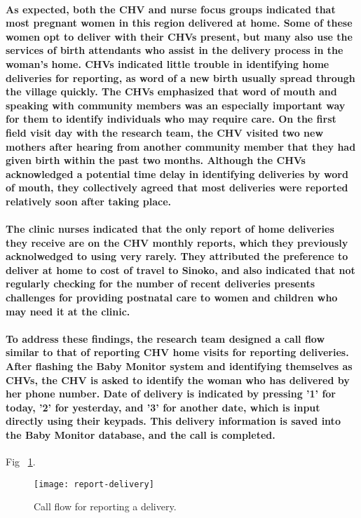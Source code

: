 \paragraph{As expected, both the CHV and nurse focus  groups indicated that most pregnant women in this region delivered at home. Some of these women opt to deliver with their CHVs present, but many also use the services of birth attendants who assist in the delivery process in the woman's home. CHVs indicated little trouble in identifying home deliveries for reporting, as word of a new birth usually spread through the village quickly. The CHVs emphasized that word of mouth and  speaking with community members was an especially important way for them to identify individuals who may require care. On the first field visit day with the research team, the CHV visited  two new mothers after hearing from another community member that they had given birth within the past two months. Although the CHVs acknowledged a potential time delay in identifying deliveries by word of mouth, they collectively agreed that most deliveries were reported relatively soon after taking place.} 

\paragraph{The clinic nurses indicated that the only report of home deliveries they receive are on the CHV monthly reports, which they previously acknolwedged to using very rarely. They attributed the preference to deliver at home to cost of travel to Sinoko, and also indicated that not regularly checking for the number of recent deliveries presents challenges for providing postnatal care to women and children who may need it at the clinic.}

\paragraph{To address these findings, the research team designed a call flow similar to that of reporting CHV home visits for reporting deliveries. After flashing the Baby Monitor system and identifying themselves as CHVs, the CHV is asked to identify the woman who has delivered by her phone number. Date of delivery is indicated by pressing '1' for today, '2' for yesterday, and '3' for another date, which is input directly using their keypads. This delivery information is saved into the Baby Monitor database, and the call is completed.}

Fig ~\ref{fig:delivery}.
\begin{figure}[]
	\begin{center}
	\texttt{[image: report-delivery]}
	\end{center}
	\caption{Call flow for reporting a delivery.}
	\label{fig:delivery}
\end{figure}

